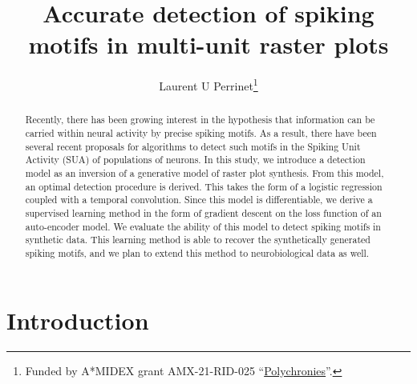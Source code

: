\documentclass[runningheads]{llncs}
\begin{document}
\title{Accurate detection of spiking motifs in multi-unit raster plots}

\author{Laurent U Perrinet\thanks{Funded by A*MIDEX grant AMX-21-RID-025 ``\href{https://laurentperrinet.github.io/grant/polychronies/}{Polychronies}''.}}
%
%
%
\maketitle              %
%
\begin{abstract} Recently, there has been growing interest in the hypothesis that information can be carried within neural activity by precise spiking motifs. As a result, there have been several recent proposals for algorithms to detect such motifs in the Spiking Unit Activity (SUA) of populations of neurons. In this study, we introduce a detection model as an inversion of a generative model of raster plot synthesis. From this model, an optimal detection procedure is derived. This takes the form of a logistic regression coupled with a temporal convolution. Since this model is differentiable, we derive a supervised learning method in the form of gradient descent on the loss function of an auto-encoder model. We evaluate the ability of this model to detect spiking motifs in synthetic data. This learning method is able to recover the synthetically generated spiking motifs, and we plan to extend this method to neurobiological data as well.
%
\end{abstract}

\section{Introduction}

\end{document}
